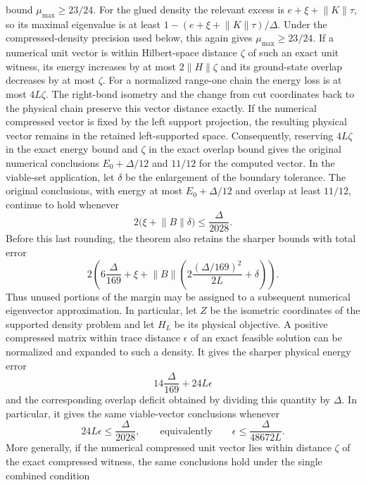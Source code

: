 \begin{lemma}
    bound $\mu_{\max}\ge 23/24$.
    For the glued density the relevant excess is
    $e+\xi+\lVert K\rVert\tau$, so its maximal eigenvalue is at least
    $1-(e+\xi+\lVert K\rVert\tau)/\Delta$.  Under the compressed-density
    precision used below, this again gives $\mu_{\max}\ge23/24$.
    If a numerical unit vector is within Hilbert-space distance $\zeta$ of
    such an exact unit witness, its energy increases by at most
    $2\lVert H\rVert\zeta$ and its ground-state overlap decreases by at most
    $\zeta$.  For a normalized range-one chain the energy loss is at most
    $4L\zeta$.
    The right-bond isometry and the change from cut coordinates back to the
    physical chain preserve this vector distance exactly.  If the numerical
    compressed vector is fixed by the left support projection, the resulting
    physical vector remains in the retained left-supported space.
    Consequently, reserving $4L\zeta$ in the exact energy bound and
    $\zeta$ in the exact overlap bound gives the original numerical
    conclusions $E_0+\Delta/12$ and $11/12$ for the computed vector.
    In the viable-set application, let $\delta$ be the enlargement of the
    boundary tolerance.  The original conclusions, with energy at most
    $E_0+\Delta/12$ and overlap at least $11/12$, continue to hold whenever
    \[
        2\bigl(\xi+\lVert B\rVert\delta\bigr)
        \le \frac{\Delta}{2028}.
    \]
    Before this last rounding, the theorem also retains the sharper bounds
    with total error
    \[
        2\left(6\frac{\Delta}{169}+\xi+
        \lVert B\rVert\left(2\frac{(\Delta/169)^2}{2L}+\delta\right)\right).
    \]
    Thus unused portions of the margin may be assigned to a subsequent
    numerical eigenvector approximation.
    In particular, let $Z$ be the isometric coordinates of the supported
    density problem and let $H_L$ be its physical objective.  A positive
    compressed matrix within trace distance $\epsilon$ of an exact feasible
    solution can be normalized and expanded to such a density.  It gives the
    sharper physical energy error
    \[
        14\frac{\Delta}{169}+24L\epsilon
    \]
    and the corresponding overlap deficit obtained by dividing this
    quantity by $\Delta$.  In particular, it gives the
    same viable-vector conclusions whenever
    \[
        24L\epsilon\le \frac{\Delta}{2028},
        \qquad\text{equivalently}\qquad
        \epsilon\le\frac{\Delta}{48672L}.
    \]
    More generally, if the numerical compressed unit vector lies within
    distance $\zeta$ of the exact compressed witness, the same conclusions
    hold under the single combined condition

\end{lemma}
